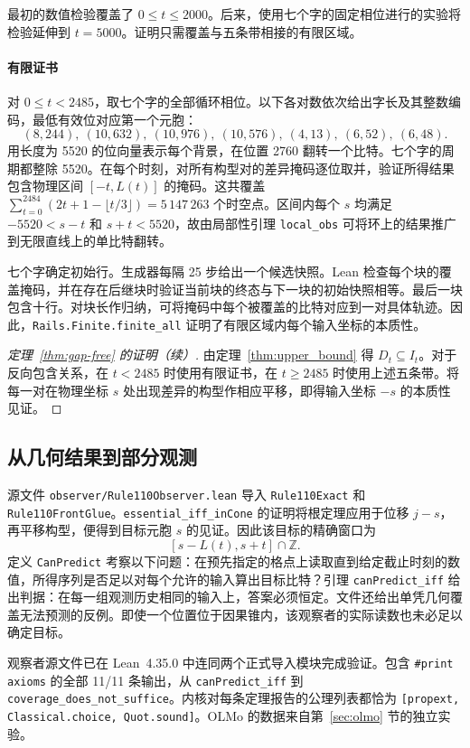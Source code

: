 最初的数值检验覆盖了 $0\le t\le2000$。后来，使用七个字的固定相位进行的实验将检验延伸到 $t=5000$。证明只需覆盖与五条带相接的有限区域。

\paragraph{有限证书}
对 $0\le t<2485$，取七个字的全部循环相位。以下各对数依次给出字长及其整数编码，最低有效位对应第一个元胞：
\[
(8,244),\ (10,632),\ (10,976),\ (10,576),\ (4,13),\ (6,52),\ (6,48).
\]
用长度为 5520 的位向量表示每个背景，在位置 2760 翻转一个比特。七个字的周期都整除 5520。在每个时刻，对所有构型对的差异掩码逐位取并，验证所得结果包含物理区间 $[-t,L(t)]$ 的掩码。这共覆盖 $\sum_{t=0}^{2484}(2t+1-\lfloor t/3\rfloor)=5\,147\,263$ 个时空点。区间内每个 $s$ 均满足 $-5520<s-t$ 和 $s+t<5520$，故由局部性引理 \texttt{local\_obs} 可将环上的结果推广到无限直线上的单比特翻转。

七个字确定初始行。生成器每隔 25 步给出一个候选快照。Lean 检查每个块的覆盖掩码，并在存在后继块时验证当前块的终态与下一块的初始快照相等。最后一块包含十行。对块长作归纳，可将掩码中每个被覆盖的比特对应到一对具体轨迹。因此，\texttt{Rails.Finite.finite\_all} 证明了有限区域内每个输入坐标的本质性。

\begin{proof}[定理~\ref{thm:gap-free} 的证明（续）]
由定理~\ref{thm:upper_bound} 得 $D_t\subseteq I_t$。对于反向包含关系，在 $t<2485$ 时使用有限证书，在 $t\ge2485$ 时使用上述五条带。将每一对在物理坐标 $s$ 处出现差异的构型作相应平移，即得输入坐标 $-s$ 的本质性见证。
\end{proof}

\subsection{从几何结果到部分观测}
源文件 \texttt{observer/Rule110Observer.lean} 导入 \texttt{Rule110Exact} 和 \texttt{Rule110FrontGlue}。\texttt{essential\_iff\_inCone} 的证明将根定理应用于位移 $j-s$，再平移构型，便得到目标元胞 $s$ 的见证。因此该目标的精确窗口为
\[
  [s-L(t),s+t]\cap\mathbb Z.
\]
定义 \texttt{CanPredict} 考察以下问题：在预先指定的格点上读取直到给定截止时刻的数值，所得序列是否足以对每个允许的输入算出目标比特？引理 \texttt{canPredict\_iff} 给出判据：在每一组观测历史相同的输入上，答案必须恒定。文件还给出单凭几何覆盖无法预测的反例。即使一个位置位于因果锥内，该观察者的实际读数也未必足以确定目标。

观察者源文件已在 Lean~4.35.0 中连同两个正式导入模块完成验证。包含 \texttt{\#print axioms} 的全部 11/11 条输出，从 \texttt{canPredict\_iff} 到 \texttt{coverage\_does\_not\_suffice}。内核对每条定理报告的公理列表都恰为 \texttt{[propext, Classical.choice, Quot.sound]}。OLMo 的数据来自第~\ref{sec:olmo} 节的独立实验。
